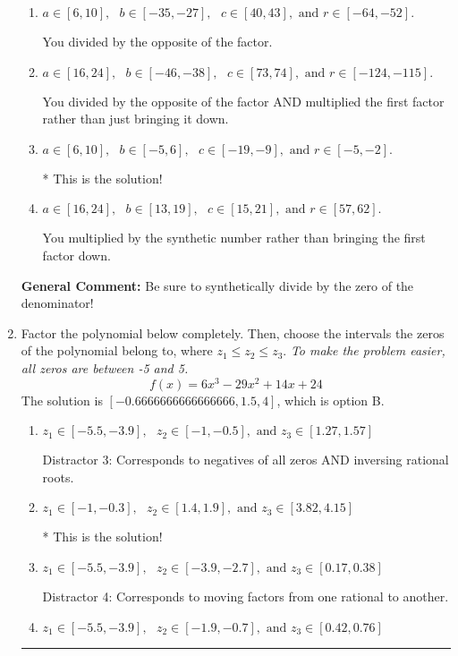 \documentclass{extbook}[14pt]
\newcommand{\litem}[1]{\item #1

\rule{\textwidth}{0.4pt}}
\begin{document}
\begin{enumerate}
{\begin{enumerate}[label=\Alph*.]
 You multiplied by the synthetic number and subtracted rather than adding during synthetic division.
\item \( a \in [6, 10], \text{   } b \in [-35, -27], \text{   } c \in [40, 43], \text{   and   } r \in [-64, -52]. \)

 You divided by the opposite of the factor.
\item \( a \in [16, 24], \text{   } b \in [-46, -38], \text{   } c \in [73, 74], \text{   and   } r \in [-124, -115]. \)

 You divided by the opposite of the factor AND multiplied the first factor rather than just bringing it down.
\item \( a \in [6, 10], \text{   } b \in [-5, 6], \text{   } c \in [-19, -9], \text{   and   } r \in [-5, -2]. \)

* This is the solution!
\item \( a \in [16, 24], \text{   } b \in [13, 19], \text{   } c \in [15, 21], \text{   and   } r \in [57, 62]. \)

 You multiplied by the synthetic number rather than bringing the first factor down.
\end{enumerate}

\textbf{General Comment:} Be sure to synthetically divide by the zero of the denominator!
}
\litem{
Factor the polynomial below completely. Then, choose the intervals the zeros of the polynomial belong to, where $z_1 \leq z_2 \leq z_3$. \textit{To make the problem easier, all zeros are between -5 and 5.}
\[ f(x) = 6x^{3} -29 x^{2} +14 x + 24 \]The solution is \( [-0.6666666666666666, 1.5, 4] \), which is option B.\begin{enumerate}[label=\Alph*.]
\item \( z_1 \in [-5.5, -3.9], \text{   }  z_2 \in [-1, -0.5], \text{   and   } z_3 \in [1.27, 1.57] \)

 Distractor 3: Corresponds to negatives of all zeros AND inversing rational roots.
\item \( z_1 \in [-1, -0.3], \text{   }  z_2 \in [1.4, 1.9], \text{   and   } z_3 \in [3.82, 4.15] \)

* This is the solution!
\item \( z_1 \in [-5.5, -3.9], \text{   }  z_2 \in [-3.9, -2.7], \text{   and   } z_3 \in [0.17, 0.38] \)

 Distractor 4: Corresponds to moving factors from one rational to another.
\item \( z_1 \in [-5.5, -3.9], \text{   }  z_2 \in [-1.9, -0.7], \text{   and   } z_3 \in [0.42, 0.76] \)


\end{enumerate}}
\end{enumerate}
\end{document}
